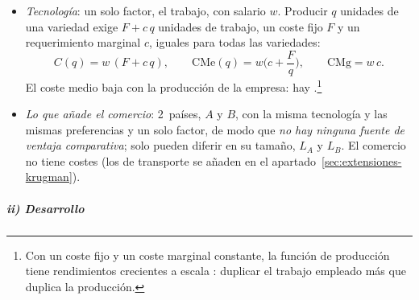 \documentclass[11pt]{article}
\begin{document}
\begin{itemize}
\begin{itemize}
  \end{itemize}
\item \emph{Tecnología}: un solo factor, el trabajo, con salario $w$. Producir $q$ unidades de una variedad exige $F+c\,q$ unidades de trabajo, un coste fijo $F$ y un requerimiento marginal $c$, iguales para todas las variedades:
  $$C(q)=w\,(F+c\,q),\qquad \mathrm{CMe}(q)=w\Big(c+\frac{F}{q}\Big),\qquad \mathrm{CMg}=w\,c.$$
  El coste medio baja con la producción de la empresa: hay  .\footnote{Con un coste fijo y un coste marginal constante, la función de producción tiene rendimientos crecientes a escala : duplicar el trabajo empleado más que duplica la producción.}
\item \emph{Lo que añade el comercio}: 2~países, $A$ y $B$, con la misma tecnología y las mismas preferencias y un solo factor, de modo que \emph{no hay ninguna fuente de ventaja comparativa}; solo pueden diferir en su tamaño, $L_A$ y $L_B$. El comercio no tiene costes (los de transporte se añaden en el apartado~\ref{sec:extensiones-krugman}).
\end{itemize}

\subparagraph{ii) Desarrollo}
\end{document}
